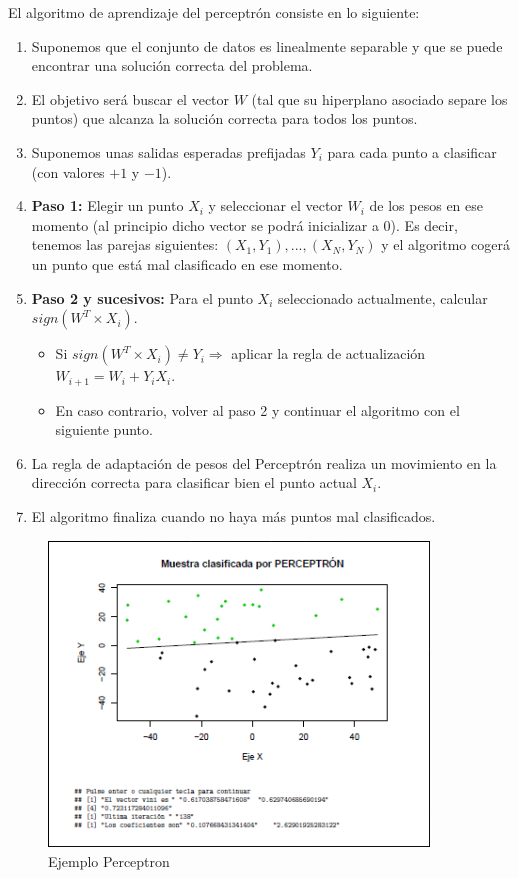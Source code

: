 \documentclass[a4paper, 11pt]{article} %
\begin{document}
El algoritmo de aprendizaje del perceptrón consiste en lo siguiente:
\begin{enumerate}
    \item Suponemos que el conjunto de datos es linealmente separable y que se puede encontrar una solución correcta del problema.
    \item El objetivo será buscar el vector $W$ (tal que su hiperplano asociado separe los puntos) que alcanza la solución correcta para todos los puntos.
    \item Suponemos unas salidas esperadas prefijadas $Y_i$ para cada punto a clasificar (con valores $+1$ y $-1$).
    \item \textbf{Paso 1:} Elegir un punto $X_i$ y seleccionar el vector $W_i$ de los pesos en ese momento (al principio dicho vector se podrá inicializar a $0$). Es decir, tenemos las parejas siguientes: ${(X_1, Y_1), ..., (X_N, Y_N)}$ y el algoritmo cogerá un punto que está mal clasificado en ese momento.
    \item \textbf{Paso 2 y sucesivos:} Para el punto $X_i$ seleccionado actualmente, calcular $sign(W^T \times X_i)$.
    \begin{itemize}
        \item Si $sign(W^T \times X_i) \neq Y_i \Rightarrow$ aplicar la regla de actualización $W_{i+1} = W_i + Y_iX_i$.
        \item En caso contrario, volver al paso 2 y continuar el algoritmo con el siguiente punto.
    \end{itemize}
    \item La regla de adaptación de pesos del Perceptrón realiza un movimiento en la dirección correcta para clasificar bien el punto actual $X_i$.
    \item El algoritmo finaliza cuando no haya más puntos mal clasificados.
\end{enumerate}

\begin{figure}[H]
\centering
\includegraphics[width=0.9\textwidth]{ejemploPerceptron.PNG}
\caption{Ejemplo Perceptron}
\label{Ejemplo Perceptron}
\end{figure}
 
\end{document}
